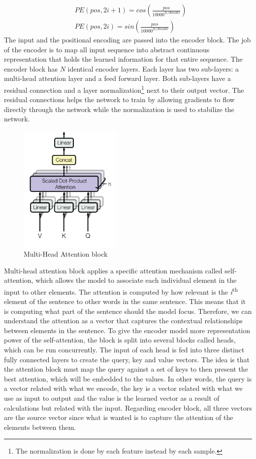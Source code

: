 \documentclass[../main.tex]{subfiles}
\begin{document}
\begin{align*}
	&PE(pos, 2i + 1) =cos(\frac{pos}{10000^{2i/dmodel}})\\
	&PE(pos, 2i) = sin(\frac{pos}{10000^{2i/dmodel}})
\end{align*}
The input and the positional encoding are passed into the encoder block. The job of the encoder is to map all input sequence into abstract continuous representation that holds the learned information for that entire sequence. The encoder block has $N$ identical encoder layers. Each layer has two sub-layers: a multi-head attention layer and a feed forward layer. Both sub-layers have a residual connection and a layer normalization\footnote{The normalization is done by each feature instead by each sample.} next to their output vector. The residual connections helps the network to train by allowing gradients to flow directly through the network while the normalization is used to stabilize the network.
\begin{figure}[H]
	\centering
	\includegraphics[width=5cm]{imgs/relatedwork/transformer-multihead}
	\caption{Multi-Head Attention block}
	\label{fig:related-transformer-multi-head}
\end{figure}
Multi-head attention block applies a specific attention mechanism called self-attention, which allows the model to associate each individual element in the input to other elements. The attention is computed by how relevant is the \textit{i}\textsuperscript{th} element of the sentence to other words in the same sentence. This means that it is computing what part of the sentence should the model focus. Therefore, we can understand the attention as a vector that captures the contextual relationships between elements in the sentence.  To give the encoder model more representation power of the self-attention, the block is split into several blocks called heads, which can be run concurrently. The input of each head is fed into three distinct fully connected layers to create the query, key and value vectors. The idea is that the attention block must map the query against a set of keys to then present the best attention, which will be embedded to the values. In other words, the query is a vector related with what we encode, the key is a vector related with what we use as input to output and the value is the learned vector as a result of calculations but related with the input. Regarding encoder block, all three vectors are the source vector since what is wanted is to capture the attention of the elements between them.
\end{document}
